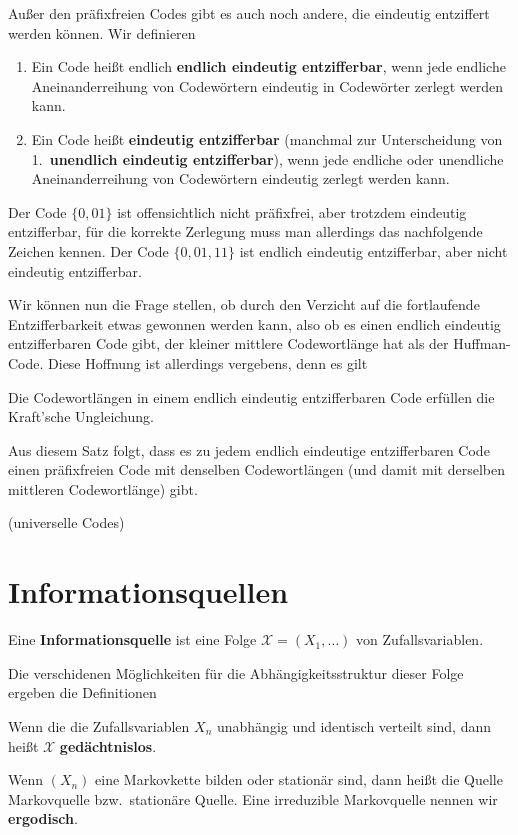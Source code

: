 Außer den präfixfreien Codes gibt es auch noch andere, die eindeutig
entziffert werden können. Wir definieren
\begin{definition}
\begin{enumerate} 
    \item Ein Code heißt endlich \textbf{endlich eindeutig entzifferbar}, wenn
jede endliche Aneinanderreihung von Codewörtern eindeutig in Codewörter
zerlegt werden kann.

\item Ein Code heißt \textbf{eindeutig entzifferbar} (manchmal zur Unterscheidung
    von 1.\ \textbf{unendlich eindeutig entzifferbar}), wenn jede endliche oder
unendliche Aneinanderreihung von Codewörtern eindeutig zerlegt werden kann.
\end{enumerate}
\end{definition}
Der Code $\{0,01\}$ ist offensichtlich nicht präfixfrei, aber trotzdem
eindeutig entzifferbar, für die korrekte Zerlegung muss man allerdings
das nachfolgende Zeichen kennen. Der Code $\{0,01,11\}$ ist endlich
eindeutig entzifferbar, aber nicht eindeutig entzifferbar.

Wir können nun die Frage stellen, ob durch den Verzicht auf die
fortlaufende Entzifferbarkeit etwas gewonnen werden kann, also ob es
einen endlich eindeutig entzifferbaren Code gibt, der kleiner mittlere
Codewortlänge hat als der Huffman-Code. Diese Hoffnung ist allerdings
vergebens, denn es gilt
\begin{satz} Die Codewortlängen in einem endlich eindeutig entzifferbaren
Code erfüllen die Kraft'sche Ungleichung.
\end{satz}
Aus diesem Satz folgt, dass es zu jedem endlich eindeutige entzifferbaren
Code einen präfixfreien Code mit denselben Codewortlängen (und damit
mit derselben mittleren Codewortlänge) gibt.

(universelle Codes)

\ifdefined\uebsps

\fi
{}

\section{Informationsquellen}
\begin{definition} Eine \textbf{Informationsquelle} ist eine Folge
$\mathcal X=(X_1,\dots)$ von Zufallsvariablen.
\end{definition}
Die verschidenen Möglichkeiten für die Abhängigkeitsstruktur dieser
Folge ergeben die Definitionen
\begin{definition}
Wenn die die Zufallsvariablen $X_n$ unabhängig und identisch
verteilt sind, dann heißt $\mathcal X$ \textbf{gedächtnislos}.

Wenn $(X_n)$ eine Markovkette bilden oder stationär sind, dann heißt
die Quelle  Markovquelle bzw.\ stationäre Quelle.
Eine irreduzible Markovquelle nennen wir \textbf{ergodisch}.
\end{definition}

